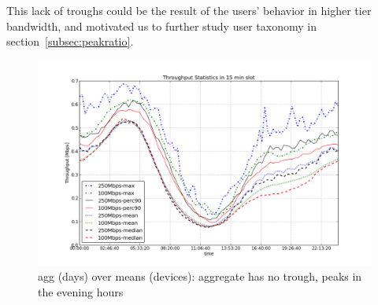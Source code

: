 
This lack of troughs could be the result of the users' behavior in higher tier bandwidth, and motivated us  to further study user taxonomy in section~\ref{subsec:peakratio}.

\begin{figure}[ht!]
\begin{minipage}{\linewidth}
  \centering
  \includegraphics[width=\linewidth]{figures/describe-total-throughput-per-day[replace].png}
  \caption{agg (days) over means (devices): aggregate has no trough, peaks in the evening hours}
  \label{fig:TS-data-rate-daily}
\end{minipage}
\end{figure}